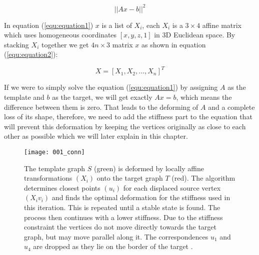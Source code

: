 \documentclass[../structure.tex]{subfiles}
\begin{document}
\begin{equation}
\label{equ:equation1}
||Ax-b||^2
\end{equation}

\hspace{2em}In equation (\ref{equ:equation1}) $x$ is a list of $X_i$, each $X_i$ is a $3\times4$ affine matrix which uses homogeneous coordinates $[x,y,z,1]$ in 3D Euclidean space. By stacking $X_i$ together we get $4n\times3$ matrix $x$ as shown in equation (\ref{equ:equation2}):

\begin{equation}
\label{equ:equation2}
X = [X_1, X_2, ... ,X_n]^T
\end{equation}

If we were to simply solve the equation (\ref{equ:equation1}) by assigning $A$ as the template and $b$ as the target, we will get exactly $Ax=b$, which means the difference between them is zero. That leads to the deforming of $A$ and a complete loss of its shape, therefore, we need to add the stiffness part to the equation that will prevent this deformation by keeping the vertices originally as close to each other as possible which we will later explain in this chapter.

\begin{figure}[h!]
\centering
\texttt{[image: 001\_conn]}
\captionsetup{justification=centering}
\caption{The template graph $S$ (green) is deformed by locally affine transformations $(X_{i})$ onto the target graph $T$ (red). The algorithm determines closest points $(u_{i})$ for each displaced source vertex $(X_{i}v_{i})$ and finds the optimal deformation for the stiffness used in this iteration. This is repeated until a stable state is found. The process then continues with a lower stiffness. Due to the stiffness constraint the vertices do not move directly towards the target graph, but may move parallel along it. The correspondences $u_{1}$
and $u_{4}$ are dropped as they lie on the border of the target \cite{Amberg2007}.}
\label{fig:figure1}
\end{figure}
\end{document}
